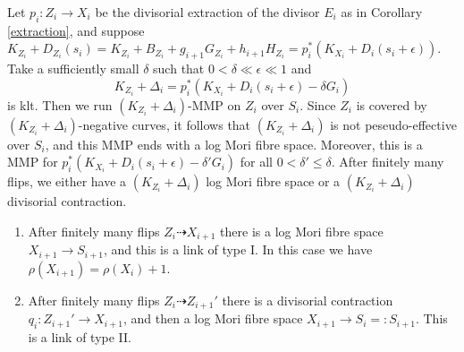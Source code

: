 \documentclass[11pt]{amsart}
\begin{document}
\begin{enumerate}
    Let $p_{i}:Z_{i}\to X_{i}$ be the divisorial extraction of the divisor $E_{i}$ as in Corollary \ref{extraction}, and suppose $K_{Z_{i}}+D_{Z_{i}}(s_{i})=K_{Z_{i}}+B_{Z_{i}}+g_{i+1}G_{Z_{i}}+h_{i+1}H_{Z_{i}}=p_{i}^*\left(K_{X_{i}}+D_{i}\left(s_{i}+\epsilon\right)\right)$.
   Take a sufficiently small $\delta$ such that $0<\delta \ll \epsilon \ll 1$ and
   \[
     K_{Z_{i}}+\Delta_{i}=p_{i}^*(K_{X_{i}}+D_{i}(s_{i}+\epsilon)-\delta G_{i})
   \]
  is klt. Then we run $(K_{Z_{i}}+\Delta_{i})$-MMP on $Z_{i}$ over $S_{i}$. Since $Z_{i}$ is covered by $(K_{Z_{i}}+\Delta_{i})$-negative curves, it follows that $(K_{Z_{i}}+\Delta_{i})$ is not peseudo-effective over $S_{i}$, and  this MMP ends with a log Mori fibre space. Moreover, this is a MMP for $p_{i}^*(K_{X_{i}}+D_{i}(s_{i}+\epsilon)-\delta'G_{i})$ for all $0<\delta'\leqslant\delta$. After finitely many flips, we either have a $(K_{Z_{i}}+\Delta_{i})$ log Mori fibre space or a $(K_{Z_{i}}+\Delta_{i})$ divisorial contraction.
  \begin{enumerate}
    \item\label{2b1} After finitely many flips $Z_{i}\dashrightarrow X_{i+1}$ there is a log Mori fibre space $X_{i+1}\to S_{i+1}$, and this is a link of type I. In this case we have $\rho(X_{i+1})=\rho(X_{i})+1$.
    \item\label{2b2} After finitely many flips $Z_{i}\dashrightarrow Z_{i+1}'$ there is a divisorial contraction $q_{i}:Z_{i+1}'\to X_{i+1}$, and then a log Mori fibre space $X_{i+1}\to S_{i}=:S_{i+1}$. This is a link of type II.
  \end{enumerate}
\end{enumerate}
\end{document}

